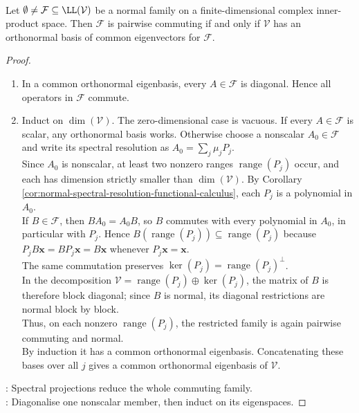 \begin{theorem} \label{thm:simultaneous-unitary-diagonalization-normal-family} \\
Let $\emptyset\neq\mathcal{F}\subseteq\LL(\mathcal{V})$ be a normal family on a finite-dimensional complex inner-product space. Then $\mathcal{F}$ is pairwise commuting if and only if $\mathcal{V}$ has an orthonormal basis of common eigenvectors for $\mathcal{F}$.
\begin{proof}
\begin{enumerate}[label=\roman*.]
\setlength{\itemsep}{0pt}
\item[$(\Leftarrow)$] In a common orthonormal eigenbasis, every $A\in\mathcal{F}$ is diagonal. Hence all operators in $\mathcal{F}$ commute.
\item[$(\Rightarrow)$] Induct on $\dim(\mathcal{V})$. The zero-dimensional case is vacuous. If every $A\in\mathcal{F}$ is scalar, any orthonormal basis works. Otherwise choose a nonscalar $A_0\in\mathcal{F}$ and write its spectral resolution as $A_0=\sum_j\mu_jP_j$.\\
Since $A_0$ is nonscalar, at least two nonzero ranges $\operatorname{range}(P_j)$ occur, and each has dimension strictly smaller than $\dim(\mathcal{V})$. By Corollary \ref{cor:normal-spectral-resolution-functional-calculus}, each $P_j$ is a polynomial in $A_0$.\\
If $B\in\mathcal{F}$, then $BA_0=A_0B$, so $B$ commutes with every polynomial in $A_0$, in particular with $P_j$. Hence $B(\operatorname{range}(P_j))\subseteq\operatorname{range}(P_j)$ because $P_jB\mathbf{x}=BP_j\mathbf{x}=B\mathbf{x}$ whenever $P_j\mathbf{x}=\mathbf{x}$.\\
The same commutation preserves $\ker(P_j)=\operatorname{range}(P_j)^{\perp}$.\\
In the decomposition $\mathcal{V}=\operatorname{range}(P_j)\oplus\ker(P_j)$, the matrix of $B$ is therefore block diagonal; since $B$ is normal, its diagonal restrictions are normal block by block.\\
Thus, on each nonzero $\operatorname{range}(P_j)$, the restricted family is again pairwise commuting and normal.\\
By induction it has a common orthonormal eigenbasis. Concatenating these bases over all $j$ gives a common orthonormal eigenbasis of $\mathcal{V}$.
\end{enumerate}
: Spectral projections reduce the whole commuting family.\\
: Diagonalise one nonscalar member, then induct on its eigenspaces.
\end{proof}
\end{theorem}

